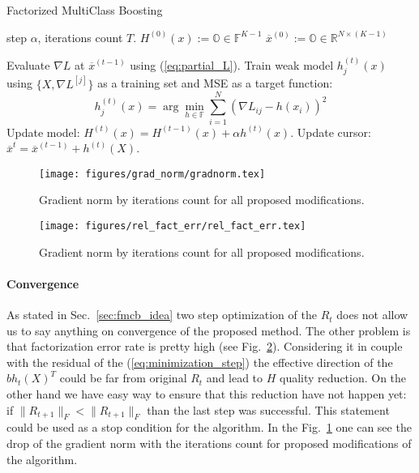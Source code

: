 \documentclass{article}
\begin{document}
\begin{algorithm}[tb]
   \caption{Factorized MultiClass Boosting}
   \label{alg:boost_mlr}
\begin{algorithmic}
    step $\alpha$, iterations count $T$.
   \STATE $H^{(0)}(x):= \mathbb{O} \in \mathbb{F}^{K-1}$ 
   \STATE $\overline{x}^{(0)} := \mathbb{O} \in \mathbb{R}^{N \times (K-1)}$ 

   		\STATE Evaluate $\nabla L$ at $\overline{x}^{(t-1)}$ using (\ref{eq:partial_L}).
   			\STATE Train weak model $h_{j}^{(t)}(x)$ using $\{X,\nabla L^{[j]}\}$ as a training set and MSE as a target function:
   			\[
				h_{j}^{(t)}(x)=\arg\min_{h \in \mathbb{F}} \sum_{i=1}^{N}\left(\nabla L_{ij}-h(x_{i})\right)^{2}
			\]
		\ENDFOR
		\STATE Update model: $H^{(t)}(x)=H^{(t-1)}(x)+\alpha h^{(t)}(x)$.
		\STATE Update cursor: $\overline{x}^{t} = \overline{x}^{(t-1)} + h^{(t)}(X)$.
   \ENDFOR
   
\end{algorithmic}
\end{algorithm}

\begin{figure}
\vskip 0.2in
\begin{center}
\centerline{\texttt{[image: figures/grad\_norm/gradnorm.tex]}}
\caption{Gradient norm by iterations count for all proposed modifications.}
\end{center}
\label{fig:gradient_norm}
\vskip -0.2in
\end{figure}

\begin{figure}
\vskip 0.2in
\begin{center}
\centerline{\texttt{[image: figures/rel\_fact\_err/rel\_fact\_err.tex]}}
\caption{Gradient norm by iterations count for all proposed modifications.}
\end{center}
\label{fig:factorization-effectiveness}
\vskip -0.2in
\end{figure}

\paragraph{Convergence}
As stated in Sec.~\ref{sec:fmcb_idea} two step optimization of the $R_t$ does not allow us to say anything on convergence of the proposed method. The other problem is that factorization error rate is pretty high (see Fig.~\ref{fig:factorization-effectiveness}). Considering it in couple with the residual of the (\ref{eq:minimization_step}) the effective direction of the $b h_t(X)^T$ could be far from original $R_t$ and lead to $H$ quality reduction. On the other hand we have easy way to ensure that this reduction have not happen yet: if $\|R_{t+1}\|_F <\|R_{t+1}\|_F$ than the last step was successful. This statement could be used as a stop condition for the algorithm. In the Fig.~\ref{fig:gradient_norm} one can see the drop of the gradient norm with the iterations count for proposed modifications of the algorithm.
\end{document}
